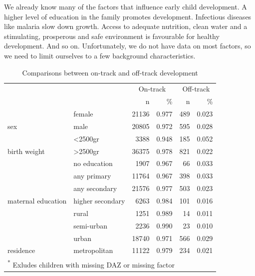\documentclass[
]{book}
\begin{document}
We already know many of the factors that influence early child development. A higher level of education in the family promotes development. Infectious diseases like malaria slow down growth. Access to adequate nutrition, clean water and a stimulating, prosperous and safe environment is favourable for healthy development. And so on. Unfortunately, we do not have data on most factors, so we need to limit ourselves to a few background characteristics.

\begin{table}

\caption{\label{tab:ontracktab}Comparisons between on-track and off-track development}
\centering
\begin{tabular}[t]{l|l|r|r|r|r}
\hline
\multicolumn{2}{c|}{ } & \multicolumn{2}{c|}{On-track} & \multicolumn{2}{c}{Off-track} \\
\cline{3-4} \cline{5-6}
 &  & n & \% & n & \%\\
\hline
 & female & 21136 & 0.977 & 489 & 0.023\\
\cline{2-6}
\multirow[t]{-2}{*}{\raggedright\arraybackslash sex} & male & 20805 & 0.972 & 595 & 0.028\\
\cline{1-6}
 & <2500gr & 3388 & 0.948 & 185 & 0.052\\
\cline{2-6}
\multirow[t]{-2}{*}{\raggedright\arraybackslash birth weight} & >2500gr & 36375 & 0.978 & 821 & 0.022\\
\cline{1-6}
 & no education & 1907 & 0.967 & 66 & 0.033\\
\cline{2-6}
 & any primary & 11764 & 0.967 & 398 & 0.033\\
\cline{2-6}
 & any secondary & 21576 & 0.977 & 503 & 0.023\\
\cline{2-6}
\multirow[t]{-4}{*}{\raggedright\arraybackslash maternal education} & higher secondary & 6263 & 0.984 & 101 & 0.016\\
\cline{1-6}
 & rural & 1251 & 0.989 & 14 & 0.011\\
\cline{2-6}
 & semi-urban & 2236 & 0.990 & 23 & 0.010\\
\cline{2-6}
 & urban & 18740 & 0.971 & 566 & 0.029\\
\cline{2-6}
\multirow[t]{-4}{*}{\raggedright\arraybackslash residence} & metropolitan & 11122 & 0.979 & 234 & 0.021\\
\hline
\multicolumn{6}{l}{\textsuperscript{*} Exludes children with missing DAZ or missing factor}\\
\end{tabular}
\end{table}
\end{document}

